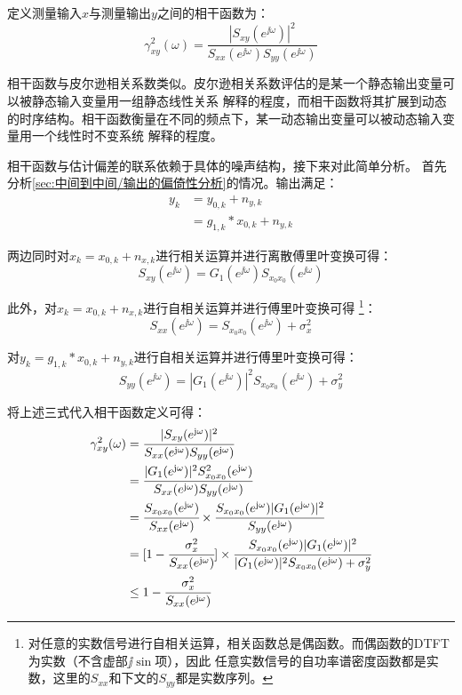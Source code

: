 定义测量输入\(x\)与测量输出\(y\)之间的相干函数为：
\begin{equation}
    \gamma_{xy}^2(\omega)=\frac{|S_{xy}(e^{\jj\omega})|^2}{S_{xx}(e^{\jj\omega})S_{yy}(e^{\jj\omega})}
\end{equation}

相干函数与皮尔逊相关系数类似。皮尔逊相关系数评估的是某一个静态输出变量可以被静态输入变量用一组静态线性关系
解释的程度，而相干函数将其扩展到动态的时序结构。相干函数衡量在不同的频点下，某一动态输出变量可以被动态输入变量用一个线性时不变系统
解释的程度。

相干函数与估计偏差的联系依赖于具体的噪声结构，接下来对此简单分析。
首先分析\ref{sec:中间到中间/输出的偏倚性分析}的情况。输出满足：
\begin{align*}
    y_k&=y_{0,k}+n_{y,k}\\
    &=g_{1,k}*x_{0,k}+n_{y,k}
\end{align*}

两边同时对\(x_k=x_{0,k}+n_{x,k}\)进行相关运算并进行离散傅里叶变换可得：
\begin{equation*}
    S_{xy}(e^{\jj\omega})=G_1(e^{\jj\omega})S_{x_0x_0}(e^{\jj\omega})
\end{equation*}

此外，对\(x_{k}=x_{0,k}+n_{x,k}\)进行自相关运算并进行傅里叶变换可得
\footnote{对任意的实数信号进行自相关运算，相关函数总是偶函数。而偶函数的DTFT为实数（不含虚部\(\jj\sin\)项），因此
任意实数信号的自功率谱密度函数都是实数，这里的\(S_{xx}\)和下文的\(S_{yy}\)都是实数序列。}：
\begin{equation*}
    S_{xx}(e^{\jj\omega})=S_{x_0x_0}(e^{\jj\omega})+\sigma_x^2
\end{equation*}

对\(y_k=g_{1,k}*x_{0,k}+n_{y,k}\)进行自相关运算并进行傅里叶变换可得：
\begin{equation*}
    S_{yy}(e^{\jj\omega})=|G_1(e^{\jj\omega})|^2S_{x_0x_0}(e^{\jj\omega})+\sigma_y^2
\end{equation*}

将上述三式代入相干函数定义可得：
\begin{align*}
    \gamma_{xy}^2(\omega)&=\cfrac{|S_{xy}(e^{\mathrm{j}\omega})|^2}{S_{xx}(e^{\mathrm{j}\omega})S_{yy}(e^{\mathrm{j}\omega})}\\
    &=\cfrac{|G_1(e^{\mathrm{j}\omega})|^2S_{x_0x_0}^2(e^{\mathrm{j}\omega})}
    {S_{xx}(e^{\mathrm{j}\omega})S_{yy}(e^{\mathrm{j}\omega})}\\
    &=\cfrac{S_{x_0x_0}(e^{\mathrm{j}\omega})}{S_{xx}(e^{\mathrm{j}\omega})}\times
    \cfrac{S_{x_0x_0}(e^{\mathrm{j}\omega})|G_1(e^{\mathrm{j}\omega})|^2}{S_{yy}(e^{\mathrm{j}\omega})}\\
    &=[1-\cfrac{\sigma_x^2}{S_{xx}(e^{\mathrm{j}\omega})}]\times
    \cfrac{S_{x_0x_0}(e^{\mathrm{j}\omega})|G_1(e^{\mathrm{j}\omega})|^2}
    {|G_1(e^{\mathrm{j}\omega})|^2S_{x_0x_0}(e^{\mathrm{j}\omega})+\sigma_y^2}\\
    &\le 1-\cfrac{\sigma_x^2}{S_{xx}(e^{\mathrm{j}\omega})}
\end{align*}


